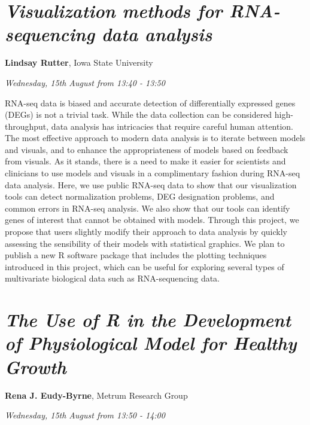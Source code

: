 \documentclass[]{book}
\theoremstyle{definition}
\theoremstyle{definition}
\theoremstyle{definition}
\theoremstyle{remark}
\begin{document}
\hypertarget{visualization-methods-for-rna-sequencing-data-analysis-1}{%
\section{\texorpdfstring{\emph{Visualization methods for RNA-sequencing
data
analysis}}{Visualization methods for RNA-sequencing data analysis}}\label{visualization-methods-for-rna-sequencing-data-analysis-1}}

\textbf{Lindsay Rutter}, Iowa State University

\emph{Wednesday, 15th August from 13:40 - 13:50}

RNA-seq data is biased and accurate detection of differentially
expressed genes (DEGs) is not a trivial task. While the data collection
can be considered high-throughput, data analysis has intricacies that
require careful human attention. The most effective approach to modern
data analysis is to iterate between models and visuals, and to enhance
the appropriateness of models based on feedback from visuals. As it
stands, there is a need to make it easier for scientists and clinicians
to use models and visuals in a complimentary fashion during RNA-seq data
analysis. Here, we use public RNA-seq data to show that our
visualization tools can detect normalization problems, DEG designation
problems, and common errors in RNA-seq analysis. We also show that our
tools can identify genes of interest that cannot be obtained with
models. Through this project, we propose that users slightly modify
their approach to data analysis by quickly assessing the sensibility of
their models with statistical graphics. We plan to publish a new R
software package that includes the plotting techniques introduced in
this project, which can be useful for exploring several types of
multivariate biological data such as RNA-sequencing data.

\hypertarget{the-use-of-r-in-the-development-of-physiological-model-for-healthy-growth-1}{%
\section{\texorpdfstring{\emph{The Use of R in the Development of
Physiological Model for Healthy
Growth}}{The Use of R in the Development of Physiological Model for Healthy Growth}}\label{the-use-of-r-in-the-development-of-physiological-model-for-healthy-growth-1}}

\textbf{Rena J. Eudy-Byrne}, Metrum Research Group

\emph{Wednesday, 15th August from 13:50 - 14:00}
\end{document}
